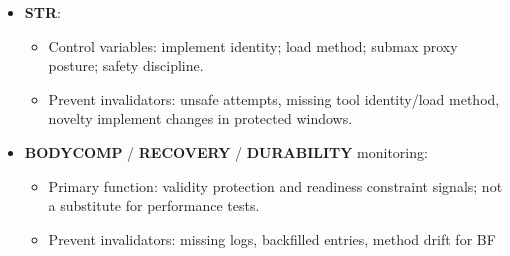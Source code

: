 \documentclass[10pt]{article}
\begin{document}
\begin{itemize}
\begin{itemize}
\end{itemize}
\item \textbf{STR}:
\begin{itemize}
\item Control variables: implement identity; load method; submax proxy posture; safety discipline.
\item Prevent invalidators: unsafe attempts, missing tool identity/load method, novelty implement changes in protected windows.
\end{itemize}
\item \textbf{BODYCOMP} / \textbf{RECOVERY} / \textbf{DURABILITY} monitoring:
\begin{itemize}
\item Primary function: validity protection and readiness constraint signals; not a substitute for performance tests.
\item Prevent invalidators: missing logs, backfilled entries, method drift for BF%
\end{itemize}
\end{itemize}

\begingroup
\scriptsize
\setlength{\tabcolsep}{2pt}
\renewcommand{\arraystretch}{1.12}
\end{document}
